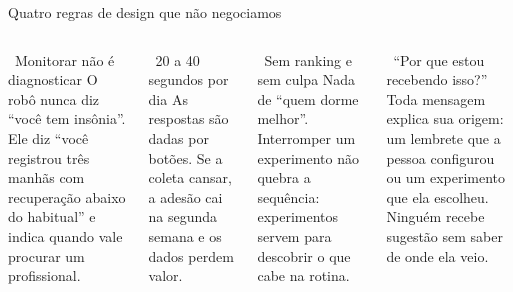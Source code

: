 \documentclass[aspectratio=169,10pt]{beamer}
\begin{document}
\begin{frame}{Quatro regras de design que não negociamos}
\begin{columns}[T,onlytextwidth]
\begin{block}{\faStethoscope\ Monitorar não é diagnosticar}
\scriptsize O robô nunca diz \enquote{você tem insônia}. Ele diz
\enquote{você registrou três manhãs com recuperação abaixo do habitual}
e indica quando vale procurar um profissional.
\end{block}
\begin{block}{\faHourglassHalf\ 20 a 40 segundos por dia}
\scriptsize As respostas são dadas por botões. Se a coleta cansar, a adesão cai na
segunda semana e os dados perdem valor.
\end{block}
\begin{block}{\faUsers\ Sem ranking e sem culpa}
\scriptsize Nada de \enquote{quem dorme melhor}. Interromper um
experimento não quebra a sequência: experimentos servem para descobrir o
que cabe na rotina.
\end{block}
\begin{block}{\faQuestionCircle\ \enquote{Por que estou recebendo isso?}}
\scriptsize Toda mensagem explica sua origem: um lembrete que a pessoa
configurou ou um experimento que ela escolheu. Ninguém recebe
sugestão sem saber de onde ela veio.
\end{block}
\end{columns}
\end{frame}
\end{document}
